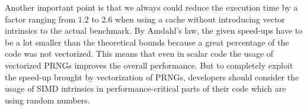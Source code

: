 \documentclass{stdlocal}
\begin{document}
    Another important point is that we always could reduce the execution time by a factor ranging from $1.2$ to $2.6$ when using a cache without introducing vector intrinsics to the actual benchmark.
    By Amdahl's law, the given speed-ups have to be a lot smaller than the theoretical bounds because a great percentage of the code was not vectorized.
    This means that even in scalar code the usage of vectorized PRNGs improves the overall performance.
    But to completely exploit the speed-up brought by vectorization of PRNGs, developers should consider the usage of SIMD intrinsics in performance-critical parts of their code which are using random numbers.
\end{document}
